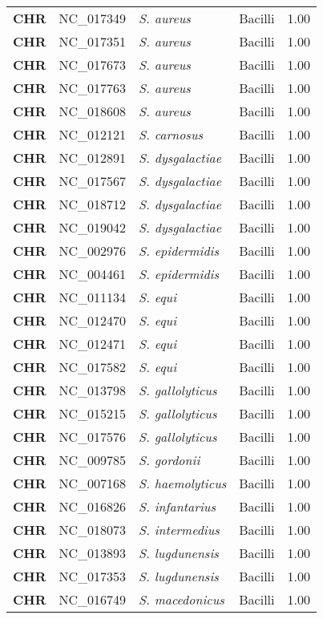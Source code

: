 \begin{adjustwidth}{-3cm}{2cm}
{\begin{supertabular}{>{\bfseries}l|p{0.1\textwidth}p{0.14\textwidth}l|l}
CHR & NC\_017349 & \textit{S. aureus} & Bacilli & 1.00\\
CHR & NC\_017351 & \textit{S. aureus} & Bacilli & 1.00\\
CHR & NC\_017673 & \textit{S. aureus} & Bacilli & 1.00\\
CHR & NC\_017763 & \textit{S. aureus} & Bacilli & 1.00\\
CHR & NC\_018608 & \textit{S. aureus} & Bacilli & 1.00\\
CHR & NC\_012121 & \textit{S. carnosus} & Bacilli & 1.00\\
CHR & NC\_012891 & \textit{S. dysgalactiae} & Bacilli & 1.00\\
CHR & NC\_017567 & \textit{S. dysgalactiae} & Bacilli & 1.00\\
CHR & NC\_018712 & \textit{S. dysgalactiae} & Bacilli & 1.00\\
CHR & NC\_019042 & \textit{S. dysgalactiae} & Bacilli & 1.00\\
CHR & NC\_002976 & \textit{S. epidermidis} & Bacilli & 1.00\\
CHR & NC\_004461 & \textit{S. epidermidis} & Bacilli & 1.00\\
CHR & NC\_011134 & \textit{S. equi} & Bacilli & 1.00\\
CHR & NC\_012470 & \textit{S. equi} & Bacilli & 1.00\\
CHR & NC\_012471 & \textit{S. equi} & Bacilli & 1.00\\
CHR & NC\_017582 & \textit{S. equi} & Bacilli & 1.00\\
CHR & NC\_013798 & \textit{S. gallolyticus} & Bacilli & 1.00\\
CHR & NC\_015215 & \textit{S. gallolyticus} & Bacilli & 1.00\\
CHR & NC\_017576 & \textit{S. gallolyticus} & Bacilli & 1.00\\
CHR & NC\_009785 & \textit{S. gordonii} & Bacilli & 1.00\\
CHR & NC\_007168 & \textit{S. haemolyticus} & Bacilli & 1.00\\
CHR & NC\_016826 & \textit{S. infantarius} & Bacilli & 1.00\\
CHR & NC\_018073 & \textit{S. intermedius} & Bacilli & 1.00\\
CHR & NC\_013893 & \textit{S. lugdunensis} & Bacilli & 1.00\\
CHR & NC\_017353 & \textit{S. lugdunensis} & Bacilli & 1.00\\
CHR & NC\_016749 & \textit{S. macedonicus} & Bacilli & 1.00\\

\end{supertabular}}
\end{adjustwidth}
